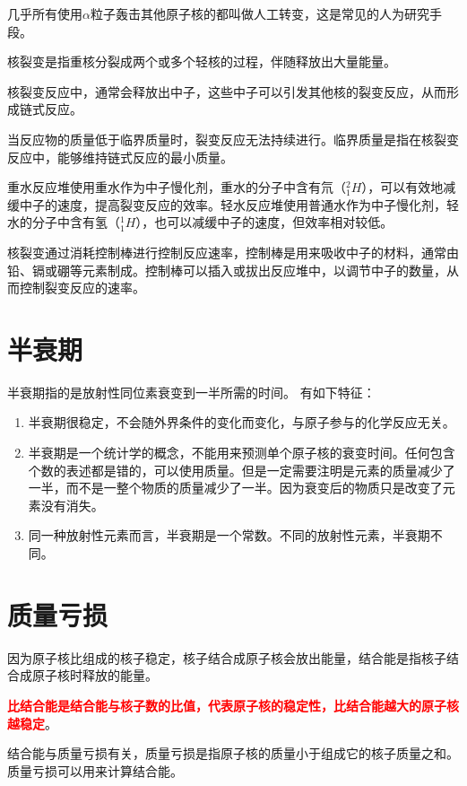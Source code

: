 \documentclass[12pt,a4paper]{article}
\begin{document}
几乎所有使用$\alpha$粒子轰击其他原子核的都叫做人工转变，这是常见的人为研究手段。

核裂变是指重核分裂成两个或多个轻核的过程，伴随释放出大量能量。

核裂变反应中，通常会释放出中子，这些中子可以引发其他核的裂变反应，从而形成链式反应。

当反应物的质量低于临界质量时，裂变反应无法持续进行。临界质量是指在核裂变反应中，能够维持链式反应的最小质量。

重水反应堆使用重水作为中子慢化剂，重水的分子中含有氘（$^2_1H$），可以有效地减缓中子的速度，提高裂变反应的效率。轻水反应堆使用普通水作为中子慢化剂，轻水的分子中含有氢（$^1_1H$），也可以减缓中子的速度，但效率相对较低。

核裂变通过消耗控制棒进行控制反应速率，控制棒是用来吸收中子的材料，通常由铅、镉或硼等元素制成。控制棒可以插入或拔出反应堆中，以调节中子的数量，从而控制裂变反应的速率。

\section{半衰期}

\indent 半衰期指的是放射性同位素衰变到一半所需的时间。
有如下特征：
\begin{tcolorbox}[colback=yellow!20, colframe=red!75!black, title=考试重点]
    \begin{enumerate}
        \item 半衰期很稳定，不会随外界条件的变化而变化，与原子参与的化学反应无关。
        \item 半衰期是一个统计学的概念，不能用来预测单个原子核的衰变时间。任何包含个数的表述都是错的，可以使用质量。但是一定需要注明是元素的质量减少了一半，而不是一整个物质的质量减少了一半。因为衰变后的物质只是改变了元素没有消失。
        \item 同一种放射性元素而言，半衰期是一个常数。不同的放射性元素，半衰期不同。
    \end{enumerate}
\end{tcolorbox}
\section{质量亏损}

\indent 因为原子核比组成的核子稳定，核子结合成原子核会放出能量，结合能是指核子结合成原子核时释放的能量。

\textbf{\textcolor{red}{比结合能是结合能与核子数的比值，代表原子核的稳定性，比结合能越大的原子核越稳定}}。

结合能与质量亏损有关，质量亏损是指原子核的质量小于组成它的核子质量之和。质量亏损可以用来计算结合能。
\end{document}
